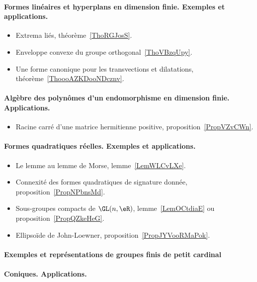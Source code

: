 \paragraph{Formes linéaires et hyperplans en dimension finie. Exemples et applications.}
\begin{itemize}
    \item Extrema liés, théorème~\ref{ThoRGJosS}.
    \item Enveloppe convexe du groupe orthogonal~\ref{ThoVBzqUpy}.
    \item Une forme canonique pour les transvections et dilatations, théorème~\ref{ThoooAZKDooNDcznv}.
\end{itemize}
\paragraph{Algèbre des polynômes d'un endomorphisme en dimension finie. Applications.}
\begin{itemize}
    \item Racine carré d'une matrice hermitienne positive, proposition~\ref{PropVZvCWn}.
\end{itemize}
\paragraph{Formes quadratiques réelles. Exemples et applications.}
\begin{itemize}
    \item Le lemme au lemme de Morse, lemme~\ref{LemWLCvLXe}.
    \item Connexité des formes quadratiques de signature donnée, proposition~\ref{PropNPbnsMd}.
    \item Sous-groupes compacts de \( \GL(n,\eR)\), lemme~\ref{LemOCtdiaE} ou proposition~\ref{PropQZkeHeG}.
    \item Ellipsoïde de John-Loewner, proposition~\ref{PropJYVooRMaPok}.
\end{itemize}
\paragraph{Exemples et représentations de groupes finis de petit cardinal}
\paragraph{Coniques. Applications.}
